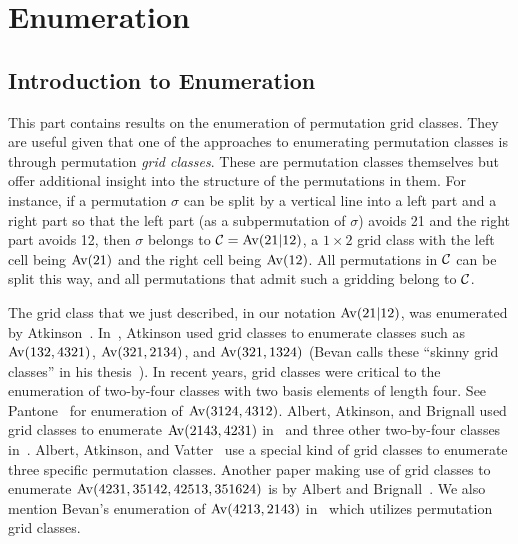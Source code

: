 \documentclass[12pt, a4paper, twoside]{report}
\begin{document}
\part{Enumeration} %
\label{part:enumeration}

\chapter{Introduction to Enumeration}
\label{chap:enumintro}
%

This part contains results on the enumeration of permutation grid classes. They are useful given that one of the approaches to enumerating permutation classes is through permutation \emph{grid classes}. These are permutation classes themselves but offer additional insight into the structure of the permutations in them. For instance, if a permutation $\sigma$ can be split by a vertical line into a left part and a right part so that the left part (as a subpermutation of $\sigma$) avoids 21 and the right part avoids 12, then $\sigma$ belongs to $\mathcal{C} = \mathrm{Av}(21|12)$, a $1\times 2$ grid class with the left cell being $\mathrm{Av}(21)$ and the right cell being $\mathrm{Av}(12)$. All permutations in $\mathcal{C}$ can be split this way, and all permutations that admit such a gridding belong to $\mathcal{C}$.

The grid class that we just described, in our notation $\mathrm{Av}(21|12)$, was enumerated by Atkinson~\cite{atkinson1998incrdecr}. In~\cite{atkinson1997restricted}, Atkinson used grid classes to enumerate classes such as $\mathrm{Av}(132,4321)$, $\mathrm{Av}(321,2134)$, and $\mathrm{Av}(321,1324)$ (Bevan calls these ``skinny grid classes'' in his thesis~\cite{bevan2015thesis}). In recent years, grid classes were critical to the enumeration of two-by-four classes with two basis elements of length four. See Pantone~\cite{pantone2by4} for enumeration of $\mathrm{Av}(3124,4312)$. Albert, Atkinson, and Brignall used grid classes to enumerate $\mathrm{Av}(2143,4231)$ in~\cite{albert2011enumeration} and three other two-by-four classes in~\cite{albert2012gridclasses}. Albert, Atkinson, and Vatter~\cite{albert2012inflations} use a special kind of grid classes to enumerate three specific permutation classes. Another paper making use of grid classes to enumerate $\mathrm{Av}(4231, 35142, 42513, 351624)$ is by Albert and Brignall~\cite{albert2014schubert}. We also mention Bevan's enumeration of $\mathrm{Av}(4213,2143)$ in~\cite{bevan-new} which utilizes permutation grid classes. 
\end{document}
